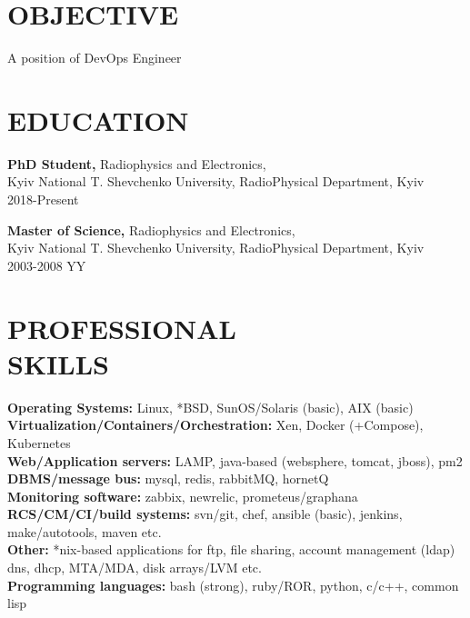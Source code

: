\documentclass[mymargin,10pt]{res} %
\begin{document}
\begin{resume}

 
\section{OBJECTIVE}  

A position of DevOps Engineer


\section{EDUCATION}

{\bf PhD Student,} Radiophysics and Electronics, \\
Kyiv National T. Shevchenko University, RadioPhysical Department, Kyiv \\
2018-Present

{\bf Master of Science,} Radiophysics and Electronics, \\
Kyiv National T. Shevchenko University, RadioPhysical Department, Kyiv \\
2003-2008 YY
 

\section{PROFESSIONAL \\ SKILLS} 

{\bf Operating Systems:} Linux, *BSD, SunOS/Solaris (basic), AIX (basic) \\
{\bf Virtualization/Containers/Orchestration:} Xen, Docker (+Compose), Kubernetes \\
{\bf Web/Application servers:} LAMP, java-based (websphere, tomcat, jboss), pm2 \\
{\bf DBMS/message bus:} mysql, redis, rabbitMQ, hornetQ \\
{\bf Monitoring software:}  zabbix, newrelic, prometeus/graphana \\
{\bf RCS/CM/CI/build systems:} svn/git, chef, ansible (basic), jenkins, make/autotools, maven etc. \\
{\bf Other:} *nix-based applications for ftp, file sharing, account management (ldap) dns, dhcp, MTA/MDA, disk arrays/LVM etc. \\
{\bf Programming languages:} bash (strong), ruby/ROR, python, c/c++, common lisp \\
 

\end{resume}
\end{document}
